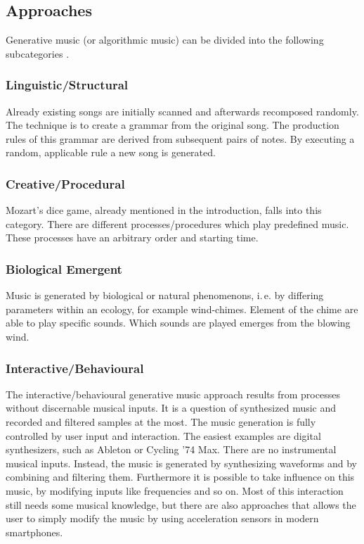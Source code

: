 	\subsection{Approaches} 

	Generative music (or algorithmic music) can be divided into the following subcategories \cite{Wooller2005}.

	\subsubsection{Linguistic/Structural}

	Already existing songs are initially scanned and afterwards recomposed randomly. 
	The technique is to create a grammar from the original song. The production rules of this grammar are derived from subsequent pairs of notes. By executing a random, applicable rule a new song is generated.

	\subsubsection{Creative/Procedural}

	Mozart's dice game, already mentioned in the introduction, falls into this category.
	There are different processes/procedures which play predefined music. These processes have an arbitrary order and starting time. 

	\subsubsection{Biological Emergent}

	Music is generated by biological or natural phenomenons, i.\,e. by differing parameters within an ecology, for example wind-chimes. Element of the chime are able to play specific sounds. Which sounds are played emerges from the blowing wind.

	\subsubsection{Interactive/Behavioural}

	The interactive/behavioural generative music approach results from processes without discernable musical inputs. It is a question of synthesized music and recorded and filtered samples at the most. The music generation is fully controlled by user input and interaction. 
	The easiest examples are digital synthesizers, such as Ableton or Cycling '74 Max. There are no instrumental musical inputs. Instead, the music is generated by synthesizing waveforms and by combining and filtering them. Furthermore it is possible to take influence on this music, by modifying inputs like frequencies and so on. Most of this interaction still needs some musical knowledge, but there are also approaches that allows the user to simply modify the music by using acceleration sensors in modern smartphones.
	
